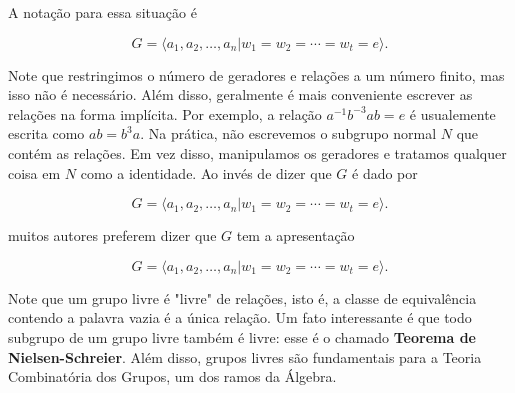 \documentclass[a4paper,portuguese,11pt,twoside, leqno]{book}
\theoremstyle{definition}
\newtheorem{example}{Exemplo}[section]
\begin{document}
	\par\vspace{0.3cm} A notação para essa situação é
	
	\begin{equation*}
	G = \langle a_1, a_2, \dots, a_n | w_1 = w_2 = \cdots = w_t = e \rangle.
	\end{equation*}
	
	\par\vspace{0.3cm} Note que restringimos o número de geradores e relações a um número finito, mas isso não é necessário. Além disso, geralmente é mais conveniente escrever as relações na forma implícita. Por exemplo, a relação $a^{-1}b^{-3}ab = e$ é usualemente escrita como $ab = b^3a$. Na prática, não escrevemos o subgrupo normal $N$ que contém as relações. Em vez disso, manipulamos os geradores e tratamos qualquer coisa em $N$ como a identidade. Ao invés de dizer que $G$ é dado por  
	
	\begin{equation*}
	G = \langle a_1, a_2, \dots, a_n | w_1 = w_2 = \cdots = w_t = e \rangle.
	\end{equation*}
	
	\par\vspace{0.3cm} muitos autores preferem dizer que $G$ tem a apresentação 
	
	\begin{equation*}
	G = \langle a_1, a_2, \dots, a_n | w_1 = w_2 = \cdots = w_t = e \rangle.
	\end{equation*}
	
	\par\vspace{0.3cm} Note que um grupo livre é "livre" de relações, isto é, a classe de equivalência contendo a palavra vazia é a única relação. Um fato interessante é que todo subgrupo de um grupo livre também é livre: esse é o chamado \textbf{Teorema de Nielsen-Schreier}. Além disso, grupos livres são fundamentais para a Teoria Combinatória dos Grupos, um dos ramos da Álgebra.
	
	\par\vspace{0.3cm}
	
	
\end{document}
